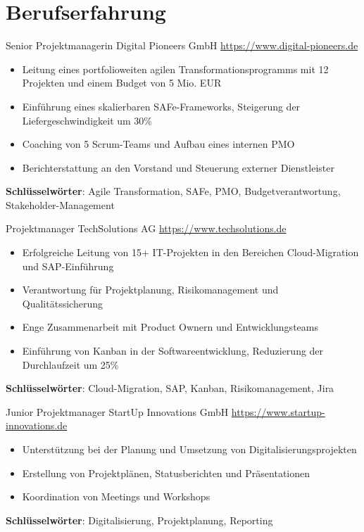 \documentclass[a4paper, serif, 10pt]{moderncv}
\begin{document}
\section{Berufserfahrung}

        {Senior Projektmanagerin}
        {Digital Pioneers GmbH}
        {\url{https://www.digital-pioneers.de}}
        {}
        {\begin{itemize}
\item Leitung eines portfolioweiten agilen Transformationsprogramms mit 12 Projekten und einem Budget von 5 Mio. EUR
\item Einführung eines skalierbaren SAFe-Frameworks, Steigerung der Liefergeschwindigkeit um 30\%
\item Coaching von 5 Scrum-Teams und Aufbau eines internen PMO
\item Berichterstattung an den Vorstand und Steuerung externer Dienstleister
\end{itemize}
\textbf{Schlüsselwörter}: Agile Transformation, SAFe, PMO, Budgetverantwortung, Stakeholder-Management}

        {Projektmanager}
        {TechSolutions AG}
        {\url{https://www.techsolutions.de}}
        {}
        {\begin{itemize}
\item Erfolgreiche Leitung von 15+ IT-Projekten in den Bereichen Cloud-Migration und SAP-Einführung
\item Verantwortung für Projektplanung, Risikomanagement und Qualitätssicherung
\item Enge Zusammenarbeit mit Product Ownern und Entwicklungsteams
\item Einführung von Kanban in der Softwareentwicklung, Reduzierung der Durchlaufzeit um 25\%
\end{itemize}
\textbf{Schlüsselwörter}: Cloud-Migration, SAP, Kanban, Risikomanagement, Jira}

        {Junior Projektmanager}
        {StartUp Innovations GmbH}
        {\url{https://www.startup-innovations.de}}
        {}
        {\begin{itemize}
\item Unterstützung bei der Planung und Umsetzung von Digitalisierungsprojekten
\item Erstellung von Projektplänen, Statusberichten und Präsentationen
\item Koordination von Meetings und Workshops
\end{itemize}
\textbf{Schlüsselwörter}: Digitalisierung, Projektplanung, Reporting}
\end{document}
